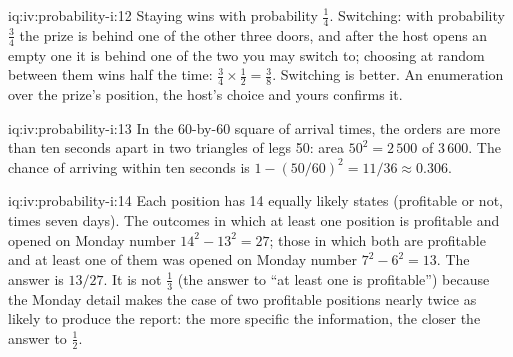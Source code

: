 \begin{solution}{iq:iv:probability-i:12}
Staying wins with probability $\tfrac14$. Switching: with probability $\tfrac34$ the prize is behind one of the
other three doors, and after the host opens an empty one it is behind one of the two you may switch to; choosing
at random between them wins half the time: $\tfrac34 \times \tfrac12 = \tfrac38$. Switching is better. An
enumeration over the prize's position, the host's choice and yours confirms it.
\end{solution}

\begin{solution}{iq:iv:probability-i:13}
In the 60-by-60 square of arrival times, the orders are more than ten seconds apart in two triangles of legs 50:
area $50^2 = 2\,500$ of $3\,600$. The chance of arriving within ten seconds is $1 - (50/60)^2 = 11/36 \approx
0.306$.
\end{solution}

\begin{solution}{iq:iv:probability-i:14}
Each position has 14 equally likely states (profitable or not, times seven days). The outcomes in which at least
one position is profitable and opened on Monday number $14^2 - 13^2 = 27$; those in which both are profitable
and at least one of them was opened on Monday number $7^2 - 6^2 = 13$. The answer is $13/27$. It is not
$\tfrac13$ (the answer to ``at least one is profitable'') because the Monday detail makes the case of two profitable
positions nearly twice as likely to produce the report: the more specific the information, the closer the answer
to $\tfrac12$.
\end{solution}
